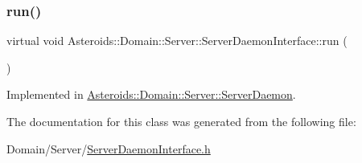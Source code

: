 \subsubsection{\texorpdfstring{run()}{run()}}
{\footnotesize\ttfamily virtual void Asteroids\+::\+Domain\+::\+Server\+::\+Server\+Daemon\+Interface\+::run (\begin{DoxyParamCaption}{ }\end{DoxyParamCaption})\hspace{0.3cm}{\ttfamily [pure virtual]}}



Implemented in \hyperlink{classAsteroids_1_1Domain_1_1Server_1_1ServerDaemon_a3f49917f69b862fd6dc916ad15fa2f92}{Asteroids\+::\+Domain\+::\+Server\+::\+Server\+Daemon}.



The documentation for this class was generated from the following file\+:\begin{DoxyCompactItemize}
\item 
Domain/\+Server/\hyperlink{ServerDaemonInterface_8h}{Server\+Daemon\+Interface.\+h}\end{DoxyCompactItemize}
